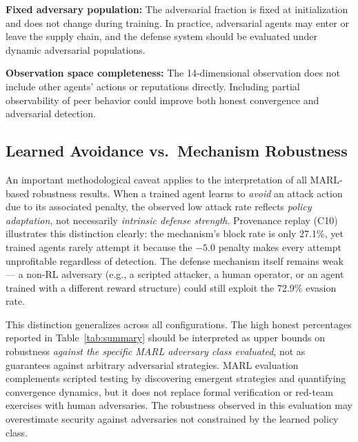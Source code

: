 \textbf{Fixed adversary population:} The adversarial fraction is fixed at
initialization and does not change during training.  In practice, adversarial
agents may enter or leave the supply chain, and the defense system should be
evaluated under dynamic adversarial populations.

\textbf{Observation space completeness:} The 14-dimensional observation does
not include other agents' actions or reputations directly.  Including partial
observability of peer behavior could improve both honest convergence and
adversarial detection.

\subsection{Learned Avoidance vs.\ Mechanism Robustness}

An important methodological caveat applies to the interpretation of all
MARL-based robustness results.  When a trained agent learns to
\emph{avoid} an attack action due to its associated penalty, the
observed low attack rate reflects \emph{policy adaptation}, not
necessarily \emph{intrinsic defense strength}.  Provenance replay (C10)
illustrates this distinction clearly: the mechanism's block rate is only
27.1\%, yet trained agents rarely attempt it because the $-5.0$ penalty
makes every attempt unprofitable regardless of detection.  The defense
mechanism itself remains weak --- a non-RL adversary (e.g., a scripted
attacker, a human operator, or an agent trained with a different reward
structure) could still exploit the 72.9\% evasion rate.

This distinction generalizes across all configurations.  The high honest
percentages reported in Table~\ref{tab:summary} should be interpreted as
upper bounds on robustness \emph{against the specific MARL adversary class
evaluated}, not as guarantees against arbitrary adversarial strategies.
MARL evaluation complements scripted testing by discovering emergent
strategies and quantifying convergence dynamics, but it does not replace
formal verification or red-team exercises with human adversaries.  The
robustness observed in this evaluation may overestimate security against
adversaries not constrained by the learned policy class.
